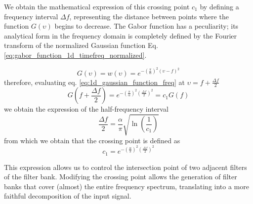 \documentclass[journal]{IEEEtran}
\begin{document}
We obtain the mathematical expression of this crossing point $c_1$ by defining a frequency interval $\Delta f$, representing the distance between points where the function $G(\upsilon)$ begins to decrease. The Gabor function has a peculiarity;  its analytical form in the frequency domain is completely defined by the Fourier transform of the normalized Gaussian function Eq. \eqref{eq:gabor_function_1d_timefreq_normalized}.

\begin{equation}\label{eq:1d_gaussian_function_freq}
    G(\upsilon) = w(\upsilon) = e ^{-\left(\frac{\pi}{\alpha}\right) ^{2} (\upsilon-f)^2}
\end{equation}
therefore, evaluating eq. \eqref{eq:1d_gaussian_function_freq} at $\upsilon = f + \frac{\Delta f}{2}$
\begin{equation}\label{eq:constant_crossing_point}
    G\left(f + \frac{\Delta f}{2}\right) = e^{-\left(\frac{\pi}{\alpha}\right)^2 \left(\frac{\Delta f}{2}\right)^2} = c_1 G(f) 
\end{equation}
we obtain the expression of the half-frequency interval 
\begin{equation}\label{eq:frequency_interval_crossing_point}
    \frac{\Delta f}{2} = \frac{\alpha}{\pi}\sqrt{\ln \left(\frac{1}{c_1}\right)}
\end{equation}
from which we obtain that the crossing point is defined as
\begin{equation}\label{eq:crossing_point}
    c_1 = e^{-\left(\frac{\alpha}{\pi} \right)^2 \left(\frac{\Delta f}{2}\right)^2 }
\end{equation}

This expression allows us to control the intersection point of two adjacent filters of the filter bank. Modifying the crossing point allows the generation of filter banks that cover (almost) the entire frequency spectrum, translating into a more faithful decomposition of the input signal.
\end{document}
